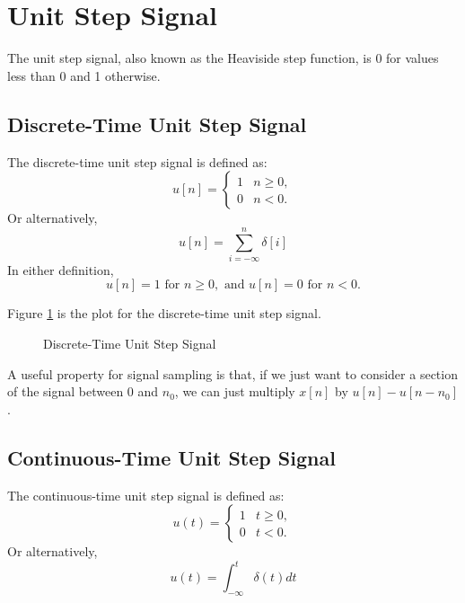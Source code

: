 \section{Unit Step Signal}
The unit step signal, also known as the Heaviside step function, is
0 for values less than 0 and 1 otherwise. 

\subsection{Discrete-Time Unit Step Signal}
The discrete-time unit step signal is defined as:
\[
u[n] =
\begin{cases}
1 & n \geq 0, \\
0 & n < 0.
\end{cases}
\]
Or alternatively,
\begin{equation}
    u[n] = \sum_{i = -\infty}^{n} \delta[i]
\end{equation}
In either definition, 
\[
u[n] = 1 \text{ for } n \geq 0, \text{ and } u[n] = 0 \text{ for } n < 0.
\]

Figure \ref{fig:dt unit} is the plot for the discrete-time unit step signal.
\begin{figure}[h!]
\centering
{}
\caption{Discrete-Time Unit Step Signal}
\label{fig:dt unit}
\end{figure}

A useful property for signal sampling is that, if we 
just want to consider a section of the signal between 
$0$ and $n_0$, we can just multiply $x[n]$ by $u[n] - u[n - n_0]$.

\subsection{Continuous-Time Unit Step Signal}
The continuous-time unit step signal is defined as:
\[
u(t) =
\begin{cases}
1 & t \geq 0, \\
0 & t < 0.
\end{cases}
\]
Or alternatively, 
\begin{equation}
    u(t) = \int_{-\infty}^{t} \delta(t) dt
\end{equation}

